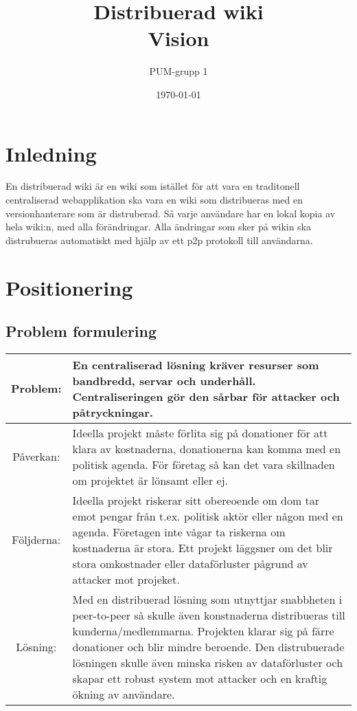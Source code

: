 

\ifpdf
\else
\fi

\title{Distribuerad wiki \\ Vision}
\author{PUM-grupp 1}
\date{\today}



\maketitle

\thispagestyle{empty}
\newpage
\section{Inledning}
En distribuerad wiki är en wiki som istället för att vara en traditonell centraliserad webapplikation ska vara en wiki som distribueras med en versionhanterare som är distruberad. Så varje användare har en lokal kopia av hela wiki:n, med alla förändringar. Alla ändringar som sker på wikin ska distrubueras automatiskt med hjälp av ett p2p protokoll till användarna. 
\section{Positionering}


\subsection{Problem formulering}
\begin{tabular}{|c|m{15 cm}|}
\hline
Problem: & En centraliserad lösning kräver resurser som bandbredd, servar och underhåll. Centraliseringen gör den sårbar för attacker och påtryckningar. \\
\hline
Påverkan: & Ideella projekt måste förlita sig på donationer för att klara av kostnaderna,  donationerna kan komma med en politisk agenda. För företag så kan det vara skillnaden om projektet är lönsamt eller ej.   \\
\hline
Följderna: & Ideella projekt riskerar sitt obereoende om dom tar emot pengar från t.ex. politisk aktör eller någon med en agenda. Företagen inte vågar ta riskerna om kostnaderna är stora. Ett projekt läggsner om det blir stora omkostnader eller dataförluster pågrund av attacker mot projeket. \\
\hline
Lösning: & Med en distribuerad lösning som utnyttjar snabbheten i peer-to-peer så skulle även konstnaderna distribueras till kunderna/medlemmarna. Projekten klarar sig på färre donationer och blir mindre beroende. Den distrubuerade lösningen skulle även minska risken av dataförluster och skapar ett robust system mot attacker och en kraftig ökning av användare. \\
\hline
\end{tabular}

